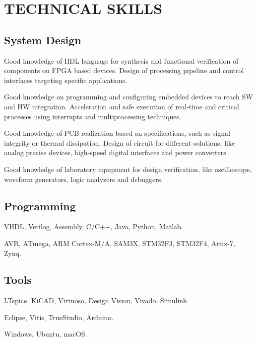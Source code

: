 \section{TECHNICAL SKILLS}
\subsection{System Design}
\begin{description}[leftmargin=5mm]
    \item[-] Good knowledge of HDL language for synthesis and functional verification of components on FPGA based devices. Design of processing pipeline and control interfaces targeting specific applications.
    \item[-] Good knowledge on programming and configuring embedded devices to reach SW and HW integration. Acceleration and safe execution of real-time and critical processes using interrupts and multiprocessing techniques.
    \item[-] Good knowledge of PCB realization based on specifications, such as signal integrity or thermal dissipation. Design of circuit for different solutions, like analog precise devices, high-speed digital interfaces and power converters.
    \item[-] Good knowledge of laboratory equipment for design verification, like oscilloscope, waveform generators, logic analyzers and debuggers.
\end{description}
\subsection{Programming}
\begin{description}[leftmargin=5mm]
    \item[- Languages:] VHDL, Verilog, Assembly, C/C++, Java, Python, Matlab.
    \item[- Devices:] AVR, ATmega, ARM Cortex-M/A, SAM3X, STM32F3, STM32F4, Artix-7, Zynq.
\end{description}

\subsection{Tools}
\begin{description}[leftmargin=5mm]
    \item[- CAD:] LTspice, KiCAD, Virtuoso, Design Vision, Vivado, Simulink.
    \item[- IDE:] Eclipse, Vitis, TrueStudio, Arduino.
    \item[- OS:] Windows, Ubuntu, macOS.
\end{description}